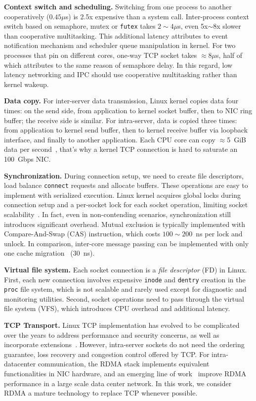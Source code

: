 \textbf{Context switch and scheduling.}
Switching from one process to another cooperatively ($0.45\mu$s) is 2.5x expensive than a system call. Inter-process context switch based on semaphore, mutex or \texttt{futex} takes $2\sim4\mu$s, even 5x$\sim$8x slower than cooperative multitasking. This additional latency attributes to event notification mechanism and scheduler queue manipulation in kernel. For two processes that pin on different cores, one-way TCP socket takes $\approx8\mu$s, half of which attributes to the same reason of semaphore delay. In this regard, low latency networking and IPC should use cooperative multitasking rather than kernel wakeup.

\textbf{Data copy.}
For inter-server data transmission, Linux kernel copies data four times: on the send side, from application to kernel socket buffer, then to NIC ring buffer; the receive side is similar. For intra-server, data is copied three times: from application to kernel send buffer, then to kernel receive buffer via loopback interface, and finally to another application. Each CPU core can copy $\approx$5~GiB data per second~\cite{panda2016netbricks}, that's why a kernel TCP connection is hard to saturate an 100~Gbps NIC.

\textbf{Synchronization.}
During connection setup, we need to create file descriptors, load balance \texttt{connect} requests and allocate buffers. These operations are easy to implement with serialized execution. Linux kernel acquires global locks during connection setup and a per-socket lock for each socket operation, limiting socket scalability~\cite{boyd2010analysis,han2012megapipe,lin2016scalable}. In fact, even in non-contending scenarios, synchronization still introduces significant overhead. Mutual exclusion is typically implemented with Compare-And-Swap (CAS) instruction, which costs $100\sim200$~ns per lock and unlock. In comparison, inter-core message passing can be implemented with only one cache migration~\cite{roghanchi2017ffwd} (30~ns).

\textbf{Virtual file system.}
Each socket connection is a \textit{file descriptor} (FD) in Linux. First, each new connection involves expensive \texttt{inode} and \texttt{dentry} creation in the \texttt{proc} file system, which is not scalable and rarely used except for diagnostic and monitoring utilities. Second, socket operations need to pass through the virtual file system (VFS), which introduces CPU overhead and additional latency.

\textbf{TCP Transport.}
Linux TCP implementation has evolved to be complicated over the years to address performance and security concerns, as well as incorporate extensions~\cite{yasukata2016stackmap}. However, intra-server sockets do not need the ordering guarantee, loss recovery and congestion control offered by TCP. For intra-datacenter communication, the RDMA stack implements equivalent functionalities in NIC hardware, and an emerging line of work~\cite{zhu2015congestion,guo2016rdma,lu2017memory,mprdma} improve RDMA performance in a large scale data center network. In this work, we consider RDMA a mature technology to replace TCP whenever possible.

